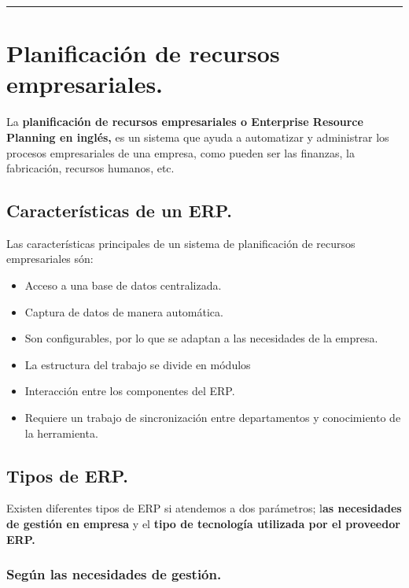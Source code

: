 \documentclass[
]{article}
\providecommand{\tightlist}{%
  \setlength{\itemsep}{0pt}\setlength{\parskip}{0pt}}
\begin{document}
\begin{center}\rule{0.5\linewidth}{0.5pt}\end{center}

\hypertarget{planificaciuxf3n-de-recursos-empresariales.}{%
\section{Planificación de recursos
empresariales.}\label{planificaciuxf3n-de-recursos-empresariales.}}

La \textbf{planificación de recursos empresariales o Enterprise Resource
Planning en inglés,} es un sistema que ayuda a automatizar y administrar
los procesos empresariales de una empresa, como pueden ser las finanzas,
la fabricación, recursos humanos, etc.

\hypertarget{caracteruxedsticas-de-un-erp.}{%
\subsection{Características de un
ERP.}\label{caracteruxedsticas-de-un-erp.}}

Las características principales de un sistema de planificación de
recursos empresariales són:

\begin{itemize}
\tightlist
\item
  Acceso a una base de datos centralizada.
\item
  Captura de datos de manera automática.
\item
  Son configurables, por lo que se adaptan a las necesidades de la
  empresa.
\item
  La estructura del trabajo se divide en módulos
\item
  Interacción entre los componentes del ERP.
\item
  Requiere un trabajo de sincronización entre departamentos y
  conocimiento de la herramienta.
\end{itemize}

\hypertarget{tipos-de-erp.}{%
\subsection{Tipos de ERP.}\label{tipos-de-erp.}}

Existen diferentes tipos de ERP si atendemos a dos parámetros;
l\textbf{as necesidades de gestión en empresa} y el \textbf{tipo de
tecnología utilizada por el proveedor ERP.}

\hypertarget{seguxfan-las-necesidades-de-gestiuxf3n.}{%
\subsubsection{Según las necesidades de
gestión.}\label{seguxfan-las-necesidades-de-gestiuxf3n.}}
\end{document}
